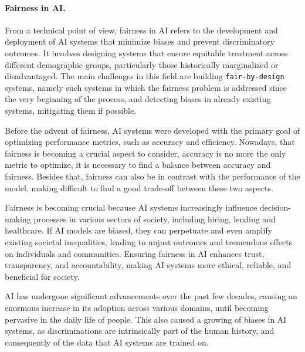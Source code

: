 \documentclass[12pt,a4paper,openright,twoside]{book}
\begin{document}
\paragraph{Fairness in \acs{AI}.}
From a technical point of view, fairness in \ac{AI} refers to the development and deployment of \ac{AI} systems that minimize biases and prevent discriminatory outcomes.
%
It involves designing systems that ensure equitable treatment across different demographic groups, particularly those historically marginalized or disadvantaged.
%
%
The main challenges in this field are building \texttt{fair-by-design} systems, namely such systems in which the fairness problem is addressed since the very beginning of the process, and detecting biases in already existing systems, mitigating them if possible.
%

Before the advent of fairness, \ac{AI} systems were developed with the primary goal of optimizing performance metrics, such as accuracy and efficiency. Nowadays, that fairness is becoming a crucial aspect to consider, accuracy is no more the only metric to optimize, it is necessary to find a balance between accuracy and fairness. Besides that, fairness can also be in contrast with the performance of the model, making difficult to find a good trade-off between these two aspects.

Fairness is becoming crucial because \ac{AI} systems increasingly influence decision-making processes in various sectors of society, including hiring, lending and healthcare.
%
If \ac{AI} models are biased, they can perpetuate and even amplify existing societal inequalities, leading to unjust outcomes and tremendous effects on individuals and communities.
%
Ensuring fairness in \ac{AI} enhances trust, transparency, and accountability, making \ac{AI} systems more ethical, reliable, and beneficial for society.

\ac{AI} has undergone significant advancements over the past few decades, causing an enormous increase in its adoption across various domains, until becoming pervasive in the daily life of people.
%
This also caused a growing of biases in \ac{AI} systems, as discriminations are intrinsically part of the human history, and consequently of the data that \ac{AI} systems are trained on.
\end{document}
